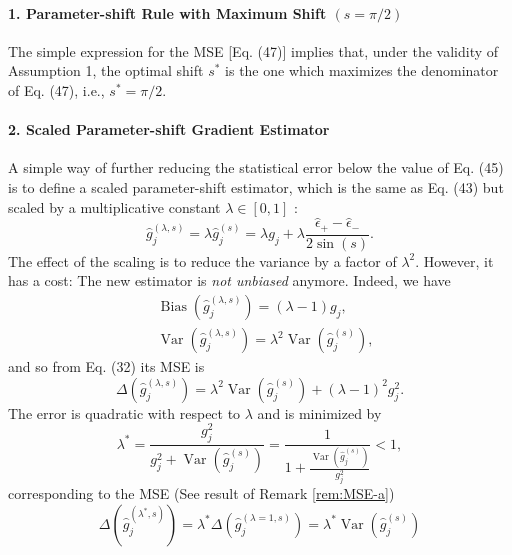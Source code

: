 \paragraph{1. Parameter-shift Rule with Maximum Shift $(s=\pi / 2)$}

The simple expression for the MSE [Eq. (47)] implies that, under the validity of Assumption 1, the optimal shift $s^*$ is the one which maximizes the denominator of Eq. (47), i.e., $s^*=\pi / 2$.

\paragraph{2. Scaled Parameter-shift Gradient Estimator}

A simple way of further reducing the statistical error below the value of Eq. (45) is to define a scaled parameter-shift estimator, which is the same as Eq. (43) but scaled by a multiplicative constant $\lambda \in[0,1]$ :
\begin{equation}
    \hat{g}_j^{(\lambda, s)}=\lambda \hat{g}_j^{(s)}=\lambda g_j+\lambda \frac{\hat{\epsilon}_{+}-\hat{\epsilon}_{-}}{2 \sin (s)} .
\end{equation}
The effect of the scaling is to reduce the variance by a factor of $\lambda^2$. However, it has a cost: The new estimator is \textit{not unbiased} anymore. Indeed, we have
\begin{equation}
    \begin{aligned}
& \operatorname{Bias}\left(\hat{g}_j^{(\lambda, s)}\right)=(\lambda-1) g_j, \\
& \operatorname{Var}\left(\hat{g}_j^{(\lambda, s)}\right)=\lambda^2 \operatorname{Var}\left(\hat{g}_j^{(s)}\right),
\end{aligned}
\end{equation}
and so from Eq. (32) its MSE is
\begin{equation}
    \Delta\left(\hat{g}_j^{(\lambda, s)}\right)=\lambda^2 \operatorname{Var}\left(\hat{g}_j^{(s)}\right)+(\lambda-1)^2 g_j^2 .
\end{equation}
The error is quadratic with respect to $\lambda$ and is minimized by
\begin{equation}
    \lambda^*=\frac{g_j^2}{g_j^2+\operatorname{Var}\left(\hat{g}_j^{(s)}\right)}=\frac{1}{1+\frac{\operatorname{Var}\left(\hat{g}_j^{(s)}\right)}{g_j^2}}<1,
\end{equation}
corresponding to the MSE (See result of Remark \ref{rem:MSE-a})
\begin{equation}
    \Delta\left(\hat{g}_j^{\left(\lambda^*, s\right)}\right)=\lambda^* \Delta\left(\hat{g}_j^{(\lambda=1, s)}\right)=\lambda^* \operatorname{Var}\left(\hat{g}_j^{(s)}\right)
\end{equation}
